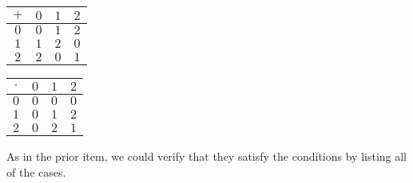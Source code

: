 \begin{exercises}
\begin{answer}
\begin{center}
\begin{tabular}{c|ccc}
             \( + \) &\( 0 \) &\( 1 \) &$2$ \\
             \hline
             \( 0 \) &\( 0 \) &\( 1 \) &$2$ \\
             \( 1 \) &\( 1 \) &\( 2 \) &$0$ \\
             $2$     &$2$     &$0$     &$1$
          \end{tabular}
          \qquad
          \begin{tabular}{c|ccc}
            \( \cdot \) &\( 0 \) &\( 1 \) &$2$ \\
            \hline
            \( 0 \)  &\( 0 \) &\( 0 \) &$0$ \\
            \( 1 \)  &\( 0 \) &\( 1 \) &$2$ \\
            $2$      &$0$     &$2$     &$1$
          \end{tabular}
       \end{center}
       As in the prior item, we could 
       verify that they satisfy the conditions  
       by listing all of the cases.
     \end{answer}
\end{exercises}
%
%
